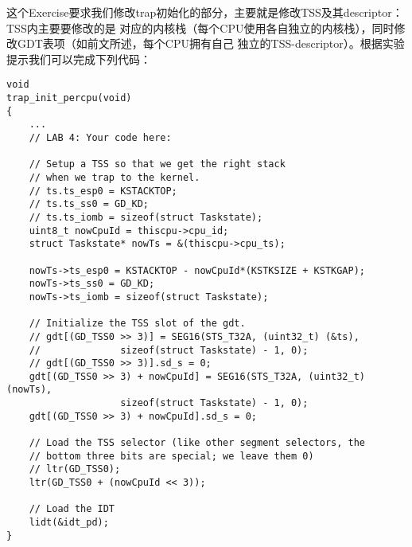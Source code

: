 \documentclass[12pt, letterpaper]{report}
\begin{document}
这个Exercise要求我们修改trap初始化的部分，主要就是修改TSS及其descriptor：TSS内主要要修改的是
对应的内核栈（每个CPU使用各自独立的内核栈），同时修改GDT表项（如前文所述，每个CPU拥有自己
独立的TSS-descriptor）。根据实验提示我们可以完成下列代码：\par 
\newpage
\lstset{style=CStyle}
\setmainfont{Consolas}
\begin{lstlisting}
void
trap_init_percpu(void)
{
    ...
    // LAB 4: Your code here:

    // Setup a TSS so that we get the right stack
    // when we trap to the kernel.
    // ts.ts_esp0 = KSTACKTOP;
    // ts.ts_ss0 = GD_KD;
    // ts.ts_iomb = sizeof(struct Taskstate);
    uint8_t nowCpuId = thiscpu->cpu_id;
    struct Taskstate* nowTs = &(thiscpu->cpu_ts);

    nowTs->ts_esp0 = KSTACKTOP - nowCpuId*(KSTKSIZE + KSTKGAP);
    nowTs->ts_ss0 = GD_KD;
    nowTs->ts_iomb = sizeof(struct Taskstate);

    // Initialize the TSS slot of the gdt.
    // gdt[(GD_TSS0 >> 3)] = SEG16(STS_T32A, (uint32_t) (&ts),
    // 				sizeof(struct Taskstate) - 1, 0);
    // gdt[(GD_TSS0 >> 3)].sd_s = 0;
    gdt[(GD_TSS0 >> 3) + nowCpuId] = SEG16(STS_T32A, (uint32_t) (nowTs),
                    sizeof(struct Taskstate) - 1, 0);
    gdt[(GD_TSS0 >> 3) + nowCpuId].sd_s = 0;

    // Load the TSS selector (like other segment selectors, the
    // bottom three bits are special; we leave them 0)
    // ltr(GD_TSS0);
    ltr(GD_TSS0 + (nowCpuId << 3));

    // Load the IDT
    lidt(&idt_pd);
}
\end{lstlisting}
\setmainfont{Times New Roman}
\end{document}

